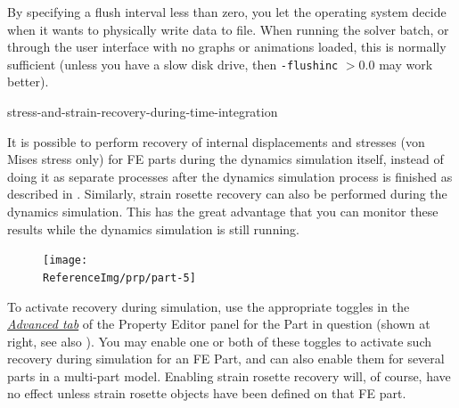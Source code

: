{By specifying a flush interval less than zero, you let the operating system
decide when it wants to physically write data to file. When running the solver
batch, or through the user interface with no graphs or animations loaded,
this is normally sufficient (unless you have a slow disk drive,
then {\tt-flushinc} $>0.0$ may work better).



           {stress-and-strain-recovery-during-time-integration}

It is possible to perform recovery of internal displacements and stresses
(von Mises stress only) for FE parts during the dynamics simulation itself,
instead of doing it as separate processes after the dynamics simulation process
is finished as described in .
Similarly, strain rosette recovery can also be performed
during the dynamics simulation. This has the great advantage that you
can monitor these results while the dynamics simulation is still running.

\begin{figure}
  \texttt{[image: \\ReferenceImg/prp/part-5]}
\end{figure}

To activate recovery during simulation, use the appropriate toggles in the
\protect\hyperlink{advanced-tab}{\sl Advanced tab} of the Property Editor panel
for the Part in question (shown at right, see also
). You may enable one
or both of these toggles to activate such recovery during simulation for
an FE Part, and can also enable them for several parts in a multi-part
model. Enabling strain rosette recovery will, of course, have no effect
unless strain rosette objects have been defined on that FE part.



}
